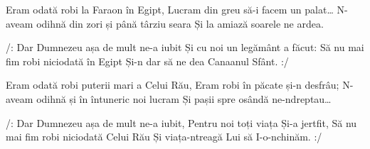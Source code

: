 \beginverse
Eram odată robi la Faraon în Egipt,
Lucram din greu să-i facem un palat…
N-aveam odihnă din zori și până târziu seara
Și la amiază soarele ne ardea.
\endverse

\beginchorus
/: Dar Dumnezeu așa de mult ne-a iubit
Și cu noi un legământ a făcut:
Să nu mai fim robi niciodată în Egipt
Și-n dar să ne dea Canaanul Sfânt. :/
\endchorus

\beginverse
Eram odată robi puterii mari a Celui Rău,
Eram robi în păcate și-n desfrâu;
N-aveam odihnă și în întuneric noi lucram
Și pașii spre osândă ne-ndreptau…
\endverse

\beginchorus
/: Dar Dumnezeu așa de mult ne-a iubit,
Pentru noi toți viața Și-a jertfit,
Să nu mai fim robi niciodată Celui Rău
Și viața-ntreagă Lui să I-o-nchinăm. :/
\endchorus
\endsong